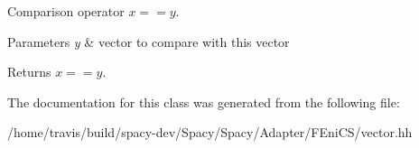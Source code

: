 \-Comparison operator $ x==y$. 


\begin{DoxyParams}{\-Parameters}
{\em y} & vector to compare with this vector \\
\hline
\end{DoxyParams}
\begin{DoxyReturn}{\-Returns}
$ x==y$. 
\end{DoxyReturn}


\-The documentation for this class was generated from the following file\-:\begin{DoxyCompactItemize}
\item 
/home/travis/build/spacy-\/dev/\-Spacy/\-Spacy/\-Adapter/\-F\-Eni\-C\-S/vector.\-hh\end{DoxyCompactItemize}
